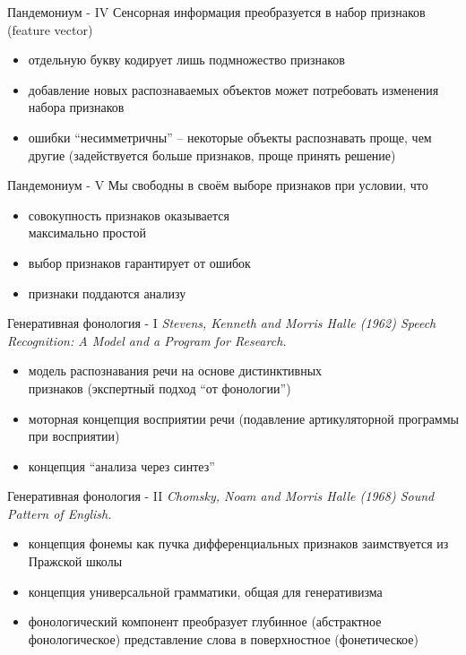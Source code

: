 \documentclass{beamer}
\begin{document}
\begin{frame}{Пандемониум - IV}
Сенсорная информация преобразуется в набор признаков (feature vector)
\bigskip
\begin{itemize}
	\item  отдельную букву кодирует лишь подмножество признаков
	\medskip
	\item добавление новых распознаваемых объектов может потребовать изменения набора признаков
	\medskip
	\item  ошибки ``несимметричны'' -- некоторые объекты распознавать проще, чем другие (задействуется больше признаков, проще принять решение)
\end{itemize}
\end{frame}

\begin{frame}{Пандемониум - V}
Мы свободны в своём выборе признаков при условии, что
\bigskip
\begin{itemize}
	\item совокупность признаков оказывается \\максимально простой
    \medskip
	\item выбор признаков гарантирует от ошибок
	\medskip
	\item признаки поддаются анализу
\end{itemize}
\end{frame}

\begin{frame}{Генеративная фонология - I}
\textit{Stevens, Kenneth and Morris Halle (1962) Speech Recognition: A Model and a Program for Research.}
\bigskip
\begin{itemize}
	\item модель распознавания речи на основе дистинктивных\\ признаков (экспертный подход ``от фонологии'')
	\medskip
	\item моторная концепция восприятии речи (подавление артикуляторной программы при восприятии)
    \medskip
	\item концепция ``анализа через синтез'' 
\end{itemize}
\end{frame}

\begin{frame}{Генеративная фонология - II}
\textit{Chomsky, Noam and Morris Halle (1968) Sound Pattern of English.}
\bigskip
\begin{itemize}
	\item концепция фонемы как пучка дифференциальных признаков заимствуется из Пражской школы
	\medskip
	\item концепция универсальной грамматики, общая для генеративизма
	\medskip 
	\item фонологический компонент преобразует глубинное (абстрактное фонологическое) представление слова в поверхностное (фонетическое)
\end{itemize}
\end{frame}
\end{document}
